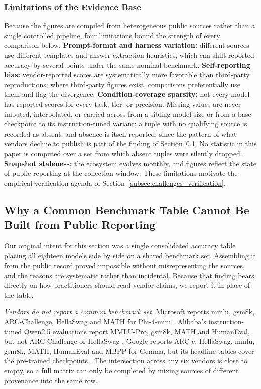 \subsubsection{Limitations of the Evidence Base}
\label{subsec:reported_limits}
Because the figures are compiled from heterogeneous public sources rather than a
single controlled pipeline, four limitations bound the strength of every
comparison below. \textbf{Prompt-format and harness variation:} different sources
use different templates and answer-extraction heuristics, which can shift reported
accuracy by several points under the same nominal benchmark. \textbf{Self-reporting
bias:} vendor-reported scores are systematically more favorable than third-party
reproductions; where third-party figures exist, comparisons preferentially use
them and flag the divergence. \textbf{Condition-coverage sparsity:} not every
model has reported scores for every task, tier, or precision. Missing values are
never imputed, interpolated, or carried across from a sibling model size or from
a base checkpoint to its instruction-tuned variant; a tuple with no qualifying
source is recorded as absent, and absence is itself reported, since the pattern
of what vendors decline to publish is part of the finding of
Section~\ref{subsec:reported_overall}. No statistic in this paper is computed
over a set from which absent tuples were silently dropped. \textbf{Snapshot staleness:} the ecosystem evolves monthly,
and figures reflect the state of public reporting at the collection window. These
limitations motivate the empirical-verification agenda of
Section~\ref{subsec:challenges_verification}.

\subsection{Why a Common Benchmark Table Cannot Be Built from Public Reporting}
\label{subsec:reported_overall}

Our original intent for this section was a single consolidated accuracy table
placing all eighteen models side by side on a shared benchmark set. Assembling it
from the public record proved impossible without misrepresenting the sources, and
the reasons are systematic rather than incidental. Because that finding bears
directly on how practitioners should read vendor claims, we report it in place of
the table.

\emph{Vendors do not report a common benchmark set.} Microsoft reports
\gls{mmlu}, \gls{gsm8k}, ARC-Challenge, HellaSwag and MATH for Phi-4-mini
\citep{microsoft2025phi4mini}. Alibaba's instruction-tuned Qwen2.5 evaluations
report MMLU-Pro, \gls{gsm8k}, MATH and HumanEval, but not ARC-Challenge or
HellaSwag \citep{qwen2024qwen25}. Google reports ARC-c, HellaSwag, \gls{mmlu},
\gls{gsm8k}, MATH, HumanEval and MBPP for Gemma, but its headline tables cover
the pre-trained checkpoints \citep{gemma2team2024,team2025gemma3}. The
intersection across any six vendors is close to empty, so a full matrix can only
be completed by mixing sources of different provenance into the same row.

